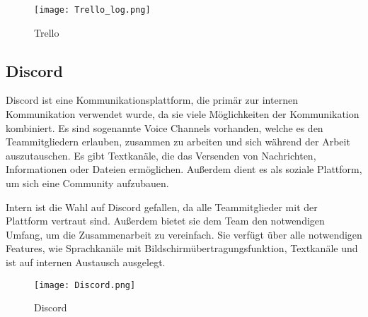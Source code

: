 \begin{figure}[H]
    \texttt{[image: Trello\_log.png]}
    \caption{Trello}
\end{figure}

\subsection{Discord}\label{subsec:Discord}
Discord ist eine Kommunikationsplattform, die primär zur internen Kommunikation verwendet wurde, da sie viele Möglichkeiten der Kommunikation kombiniert.
Es sind sogenannte Voice Channels vorhanden, welche es den Teammitgliedern erlauben, zusammen zu arbeiten und sich während der Arbeit auszutauschen.
Es gibt Textkanäle, die das Versenden von Nachrichten, Informationen oder Dateien ermöglichen.
Außerdem dient es als soziale Plattform, um sich eine Community aufzubauen.

Intern ist die Wahl auf Discord gefallen, da alle Teammitglieder mit der Plattform vertraut sind.
Außerdem bietet sie dem Team den notwendigen Umfang, um die Zusammenarbeit zu vereinfach.
Sie verfügt über alle notwendigen Features, wie Sprachkanäle mit Bildschirmübertragungsfunktion, Textkanäle und ist auf internen Austausch ausgelegt.

\begin{figure}[H]
    \centering
    \texttt{[image: Discord.png]}
    \caption{Discord}
\end{figure}
%

\renewcommand{\kapitelautor}{}
